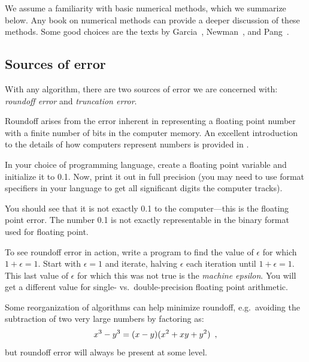 We assume a familiarity with basic numerical methods, which we
summarize below.  Any book on numerical methods can provide a
deeper discussion of these methods.  Some good choices are the
texts by Garcia~\cite{garcia}, Newman~\cite{newman}, and Pang~\cite{pang}.

\subsection{Sources of error}

With any algorithm, there are two sources of error we are concerned
with: {\em roundoff error} and {\em truncation error}.

Roundoff arises from the error inherent in representing a floating
point number with a finite number of bits in the computer memory.  An
excellent introduction to the details of how computers represent
numbers is provided in \cite{goldberg:1991}.

\begin{exercise}
In your choice of programming language, create a floating point
variable and initialize it to 0.1.  Now, print it out in full
precision (you may need to use format specifiers in your language to
get all significant digits the computer tracks).  

You should see that it is not exactly 0.1 to the computer---this is
the floating point error.  The number 0.1 is not exactly representable
in the binary format used for floating point.
\end{exercise}


\begin{exercise}
To see roundoff error in action, write a program to find the value of
$\epsilon$ for which $1 + \epsilon = 1$.  Start with $\epsilon = 1$
and iterate, halving $\epsilon$ each iteration until $1 + \epsilon =
1$. This last value of $\epsilon$ for which this was not true is
the {\em machine epsilon}.  You will get a different value for
single- vs.\ double-precision floating point arithmetic.
\end{exercise}

Some reorganization of algorithms can help minimize roundoff,
e.g.\ avoiding the subtraction of two very large numbers by factoring as:
\begin{equation}
x^3 - y^3 = (x - y)(x^2 + xy + y^2) \enskip ,
\end{equation}
but roundoff error will always be present at some level.

